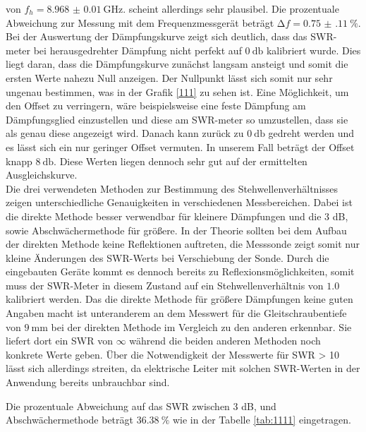 von $f_h = \SI{8.968(10)}{\giga\hertz}.$ scheint allerdings sehr plausibel. Die prozentuale Abweichung zur Messung mit dem Frequenzmessgerät beträgt $\increment f = \SI{0.75(11)}{\percent}$.
\\
\newline
Bei der Auswertung der Dämpfungskurve zeigt sich deutlich, dass das SWR-meter bei herausgedrehter Dämpfung nicht perfekt auf $\SI{0}{\decibel}$ kalibriert wurde. 
Dies liegt daran, dass die Dämpfungskurve zunächst langsam ansteigt und somit die ersten Werte nahezu Null anzeigen. Der Nullpunkt lässt sich somit nur sehr
ungenau bestimmen, was in der Grafik \ref{111} zu sehen ist. Eine Möglichkeit, um den Offset zu verringern, wäre beispielsweise eine feste Dämpfung am
Dämpfungsglied einzustellen und diese am SWR-meter so umzustellen, dass sie als genau diese angezeigt wird. Danach kann zurück zu $\SI{0}{\decibel}$ gedreht werden und
es lässt sich ein nur geringer Offset vermuten. 
In unserem Fall beträgt der Offset knapp $\SI{8}{\decibel}$. Diese Werten liegen dennoch sehr gut auf der ermittelten Ausgleichskurve.
\\ 
\newline
Die drei verwendeten Methoden zur Bestimmung des Stehwellenverhältnisses zeigen unterschiedliche Genauigkeiten in verschiedenen Messbereichen. Dabei ist die direkte Methode besser verwendbar
für kleinere Dämpfungen und die 3 dB, sowie Abschwächermethode für größere. In der Theorie sollten bei dem Aufbau der direkten Methode keine Reflektionen auftreten, die Messsonde zeigt somit nur kleine Änderungen des SWR-Werts bei Verschiebung der Sonde. Durch die eingebauten Geräte kommt es dennoch bereits zu Reflexionsmöglichkeiten, somit muss 
der SWR-Meter in diesem Zustand auf ein Stehwellenverhältnis von $\SI{1.0}{}$ kalibriert werden. Das die direkte Methode für größere Dämpfungen keine guten Angaben macht ist unteranderem an dem Messwert für die Gleitschraubentiefe von $\SI{9}{\milli\meter}$ 
bei der direkten Methode im Vergleich zu den anderen erkennbar. Sie liefert dort ein SWR von $\infty$ während die beiden anderen Methoden noch konkrete Werte geben. 
Über die Notwendigkeit der Messwerte für SWR > 10 lässt sich allerdings streiten, da elektrische Leiter mit solchen SWR-Werten in der Anwendung bereits unbrauchbar sind.
\\
\begin{flushleft}
Die prozentuale Abweichung auf das SWR zwischen 3 dB, und Abschwächermethode beträgt $\SI{36.38}{\percent}$ wie in der Tabelle \ref{tab:1111} eingetragen.
\end{flushleft}
